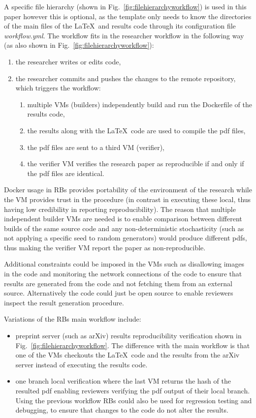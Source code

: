 \documentclass[journal]{IEEEtran}
\begin{document}
A specific file hierarchy (shown in Fig.~\ref{fig:filehierarchyworkflow}) is used in this paper however this is optional, as the template only needs to know the directories of the main files of the \LaTeX\ and results code through its configuration file \textit{workflow.yml}.
The workflow fits in the researcher workflow in the following way (as also shown in Fig.~\ref{fig:filehierarchyworkflow}):
\begin{enumerate}
	\item the researcher writes or edits code,
	\item the researcher commits and pushes the changes to the remote repository, which triggers the workflow:
		\begin{enumerate}
			\item multiple VMs (builders) independently build and run the Dockerfile of the results code,
			\item the results along with the \LaTeX\ code are used to compile the pdf files,
			\item the pdf files are sent to a third VM (verifier),
			\item the verifier VM verifies the research paper as reproducible if and only if the pdf files are identical.
		\end{enumerate}
\end{enumerate}

Docker usage in RBs provides portability of the environment of the research while the VM provides trust in the procedure (in contrast in executing these local, thus having low credibility in reporting reproducibility).
The reason that multiple independent builder VMs are needed is to enable comparison between different builds of the same source code and any non-deterministic stochasticity (such as not applying a specific seed to random generators) would produce different pdfs, thus making the verifier VM report the paper as non-reproducible.

Additional constraints could be imposed in the VMs such as disallowing images in the code and monitoring the network connections of the code to ensure that results are generated from the code and not fetching them from an external source.
Alternatively the code could just be open source to enable reviewers inspect the result generation procedure.

Variations of the RBs main workflow include:
\begin{itemize}
	\item preprint server (such as arXiv) results reproducibility verification shown in Fig.~\ref{fig:filehierarchyworkflow}.
		The difference with the main workflow is that one of the VMs checkouts the \LaTeX\ code and the results from the arXiv server instead of executing the results code.
	\item one branch local verification where the last VM returns the hash of the resulted pdf enabling reviewers verifying the pdf output of their local branch.
		Using the previous workflow RBs could also be used for regression testing and debugging, to ensure that changes to the code do not alter the results.
\end{itemize}
\end{document}
